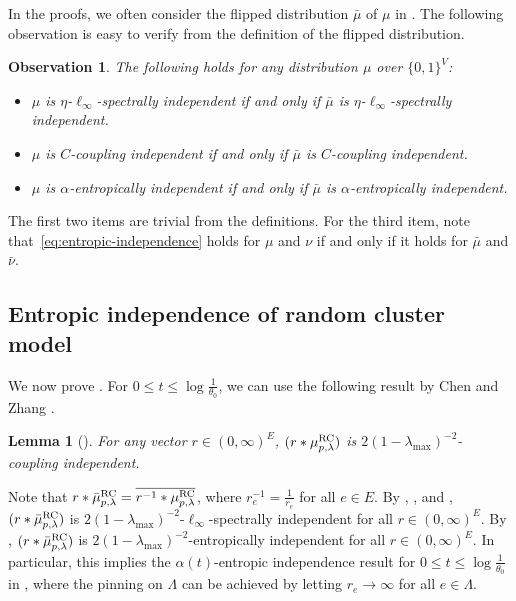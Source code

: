 \documentclass[11pt,a4paper]{article}
\newcommand{\e}{\mathrm{e}}
\newtheorem{observation}[theorem]{Observation}
\newtheorem{lemma}[theorem]{Lemma}
\theoremstyle{definition}
\begin{document}
In the proofs, we often consider the flipped distribution $\bar{\mu}$ of $\mu$ in . The following observation is easy to verify from the definition of the flipped distribution.
\begin{observation}\label{ob:CI}
The following holds for any distribution $\mu$ over $\{0,1\}^V$:
\begin{itemize}
    \item $\mu$ is $\eta$-$\ell_\infty$-spectrally independent if and only if $\bar{\mu}$ is $\eta$-$\ell_\infty$-spectrally independent.
    \item $\mu$ is $C$-coupling independent if and only if $\bar{\mu}$ is $C$-coupling independent.
    \item $\mu$ is $\alpha$-entropically independent if and only if $\bar{\mu}$ is $\alpha$-entropically independent.
\end{itemize}
\end{observation}
The first two items are trivial from the definitions. For the third item, note that~\eqref{eq:entropic-independence} holds for $\mu$ and $\nu$ if and only if it holds for $\bar{\mu}$ and $\bar{\nu}$.

\subsection{Entropic independence of random cluster model}\label{sec:RC-EI-proof}

We now prove .
For $0 \leq t \leq \log\frac{1}{\theta_0}$, we can use the following result by Chen and Zhang \cite{CZ23}.




\begin{lemma}[]\label{lem:RC-CI}
For any vector $r \in (0,\infty)^E$,
$(r * \mu_{p,\lambda}^{\textnormal{RC}})$ is $2(1-\lambda_{\max})^{-2}$-coupling independent.
\end{lemma}


Note that $r * \bar{\mu}_{p,\lambda}^{\textnormal{RC}} = \overline{r^{-1} * \mu_{p,\lambda}^{\textnormal{RC}}}$, where $r^{-1}_e  = \frac{1}{r_e}$ for all $e \in E$.
By , , and , $(r * \bar{\mu}_{p,\lambda}^{\textnormal{RC}})$ is $2(1-\lambda_{\max})^{-2}$-$\ell_\infty$-spectrally independent for all $r \in (0,\infty)^E$.
By , $(r * \bar{\mu}_{p,\lambda}^{\textnormal{RC}})$ is $2(1-\lambda_{\max})^{-2}$-entropically independent for all $r \in (0,\infty)^E$.
In particular, this implies the $\alpha(t)$-entropic independence result for $0 \leq t \leq \log\frac{1}{\theta_0}$ in , where the pinning on $\Lambda$ can be achieved by letting $r_e \to \infty$ for all $e \in \Lambda$.
\end{document}
